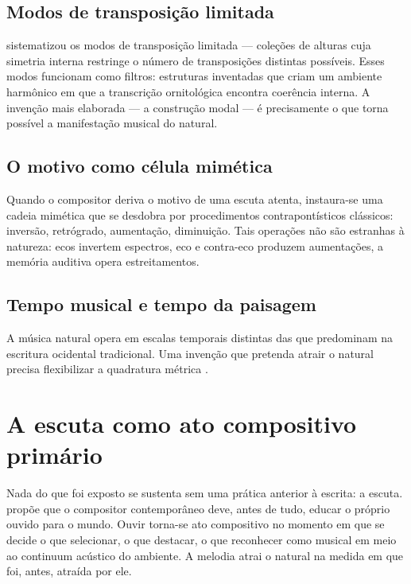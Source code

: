 \documentclass[12pt,a4paper]{article}
\begin{document}
\subsection{Modos de transposição limitada}

\citet{Messiaen1994} sistematizou os modos de transposição limitada --- coleções de alturas cuja simetria interna restringe o número de transposições distintas possíveis. Esses modos funcionam como filtros: estruturas inventadas que criam um ambiente harmônico em que a transcrição ornitológica encontra coerência interna. A invenção mais elaborada --- a construção modal --- é precisamente o que torna possível a manifestação musical do natural.

\subsection{O motivo como célula mimética}

Quando o compositor deriva o motivo de uma escuta atenta, instaura-se uma cadeia mimética que se desdobra por procedimentos contrapontísticos clássicos: inversão, retrógrado, aumentação, diminuição. Tais operações não são estranhas à natureza: ecos invertem espectros, eco e contra-eco produzem aumentações, a memória auditiva opera estreitamentos.

\subsection{Tempo musical e tempo da paisagem}

A música natural opera em escalas temporais distintas das que predominam na escritura ocidental tradicional. Uma invenção que pretenda atrair o natural precisa flexibilizar a quadratura métrica \citep{Cage1961}.

\section{A escuta como ato compositivo primário}

Nada do que foi exposto se sustenta sem uma prática anterior à escrita: a escuta. \citet{Schafer1991} propõe que o compositor contemporâneo deve, antes de tudo, educar o próprio ouvido para o mundo. Ouvir torna-se ato compositivo no momento em que se decide o que selecionar, o que destacar, o que reconhecer como musical em meio ao continuum acústico do ambiente. A melodia atrai o natural na medida em que foi, antes, atraída por ele.
\end{document}

